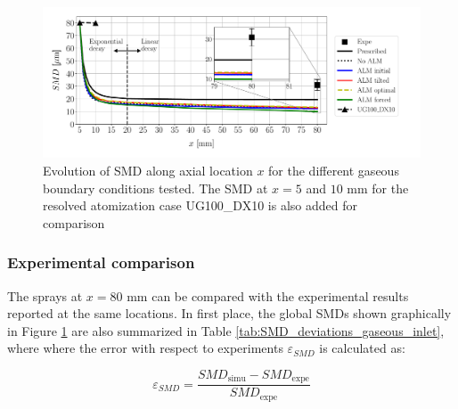 \begin{figure}[h!]
\centering
\includegraphics[scale=0.45]{./part2_developments/figures_ch6_lagrangian_JICF/params_gaseous_initial_conditions/SMD_vs_x_gaseous_BCs_comparison}
\caption[Evolution of SMD along axial location $x$ for the different gaseous boundary conditions tested]{Evolution of SMD along axial location $x$ for the different gaseous boundary conditions tested. The SMD at $x = 5$ and $10$ mm for the resolved atomization case UG100\_DX10 is also added for comparison}
\label{fig:SMD_vs_x_param_gaseous_BCs}
\end{figure}


\subsubsection*{Experimental comparison}

The sprays at $x = 80$ mm can be compared with the experimental results reported at the same locations. In first place, the global SMDs shown graphically in Figure \ref{fig:SMD_vs_x_param_gaseous_BCs} are also summarized in Table \ref{tab:SMD_deviations_gaseous_inlet}, where where the error with respect to experiments $\varepsilon_{SMD}$ is calculated as:

\begin{equation}
\label{eq:error_expe_SMD_LGS_simus}
\varepsilon_{SMD} = \frac{SMD_\mathrm{simu} - SMD_\mathrm{expe}}{SMD_\mathrm{expe}}
\end{equation}

